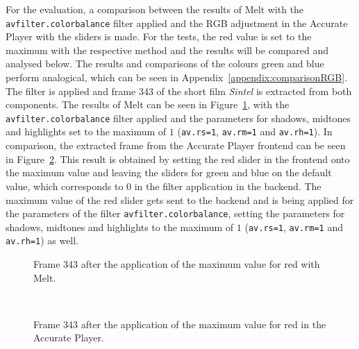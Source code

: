 \documentclass[../MasterThesis.tex]{subfiles}
\begin{document}
For the evaluation, a comparison between the results of Melt with the \texttt{avfilter.colorbalance} filter applied and the RGB adjustment in the Accurate Player with the sliders is made.
For the tests, the red value is set to the maximum with the respective method and the results will be compared and analysed below. The results and comparisons of the colours green and blue perform analogical, which can be seen in Appendix~\ref{appendix:comparisonRGB}.
The filter is applied and frame 343 of the short film \textit{Sintel} is extracted from both components. The results of Melt can be seen in Figure~\ref{figure:redMelt}, with the \texttt{avfilter.colorbalance} filter applied and the parameters for shadows, midtones and highlights set to the maximum of $1$ (\texttt{av.rs=1}, \texttt{av.rm=1} and \texttt{av.rh=1}).
In comparison, the extracted frame from the Accurate Player frontend can be seen in Figure~\ref{figure:redAP}. This result is obtained by setting the red slider in the frontend onto the maximum value and leaving the sliders for green and blue on the default value, which corresponds to $0$ in the filter application in the backend. The maximum value of the red slider gets sent to the backend and is being applied for the parameters of the filter \texttt{avfilter.colorbalance}, setting the parameters for shadows, midtones and highlights to the maximum of $1$ (\texttt{av.rs=1}, \texttt{av.rm=1} and \texttt{av.rh=1}) as well.



\begin{minipage}{0.48\textwidth}
	\begin{figure}[H]
		\begin{center}
			\caption[Frame 343 after the application of the red filter with Melt.]{Frame 343 after the application of the maximum value for red with Melt.}
			\label{figure:redMelt}
		\end{center}
	\end{figure}
\end{minipage}\begin{minipage}{0.04\textwidth}
	\ 
\end{minipage}\begin{minipage}{0.48\textwidth}
	\begin{figure}[H]
		\begin{center}
			\caption[Frame 343 after the application of the red filter in the Accurate Player.]{Frame 343 after the application of the maximum value for red in the Accurate Player.}
			\label{figure:redAP}
		\end{center}
	\end{figure}
\end{minipage}
\end{document}
